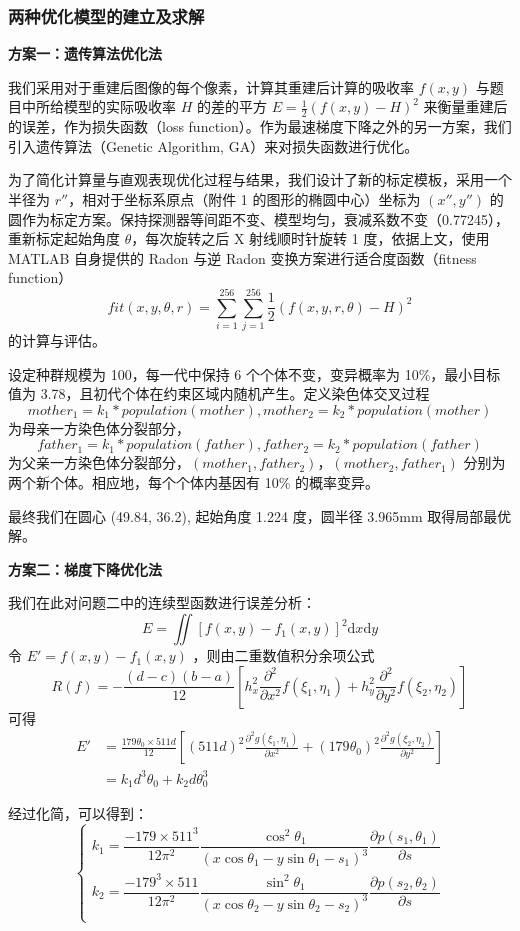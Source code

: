 \documentclass[UTF8]{ctexart}
\begin{document}
\subsubsection{两种优化模型的建立及求解}

\textbf{方案一：遗传算法优化法}

我们采用对于重建后图像的每个像素，计算其重建后计算的吸收率 $f(x, y)$ 与题目中所给模型的实际吸收率 $H$ 的差的平方 $E = \frac{1}{2}(f(x, y) - H)^2$ 来衡量重建后的误差，作为损失函数（loss function）。作为最速梯度下降之外的另一方案，我们引入遗传算法（Genetic Algorithm, GA）来对损失函数进行优化。

为了简化计算量与直观表现优化过程与结果，我们设计了新的标定模板，采用一个半径为 $r''$，相对于坐标系原点（附件 1 的图形的椭圆中心）坐标为 $(x'', y'')$ 的圆作为标定方案。保持探测器等间距不变、模型均匀，衰减系数不变（0.77245），重新标定起始角度 $\theta$，每次旋转之后 X 射线顺时针旋转 1 度，依据上文，使用 MATLAB 自身提供的 Radon 与逆 Radon 变换方案进行适合度函数（fitness function）
$$fit(x, y, \theta, r) = \sum_{i = 1}^{256}\sum_{j = 1}^{256}\frac{1}{2}(f(x, y, r, \theta) - H)^2$$
的计算与评估。

设定种群规模为 100，每一代中保持 6 个个体不变，变异概率为 10\%，最小目标值为 3.78，且初代个体在约束区域内随机产生。定义染色体交叉过程
$$mother_1 = k_1 * population(mother), mother_2 = k_2 * population(mother)$$
为母亲一方染色体分裂部分，
$$father_1 = k_1 * population(father), father_2 = k_2 * population(father)$$
为父亲一方染色体分裂部分，$(mother_1, father_2)$，$(mother_2, father_1)$ 分别为两个新个体。相应地，每个个体内基因有 10\% 的概率变异。

最终我们在圆心 (49.84, 36.2), 起始角度 1.224 度，圆半径 3.965mm 取得局部最优解。

\textbf{方案二：梯度下降优化法}

我们在此对问题二中的连续型函数进行误差分析：
$$ E=\iint [f(x,y)-f_1(x,y)]^2\mathrm{d}x\mathrm{d}y $$
令 $ E'=f(x,y)-f_1(x,y) $ ，则由二重数值积分余项公式 
$$ R(f)=-\frac{(d-c)(b-a)}{12}[h_x^2\frac{\partial^2}{\partial x^2}f(\xi_1,\eta_1)+h_y^2\frac{\partial^2}{\partial y^2}f(\xi_2,\eta_2)] $$
可得
\begin{align*}
E' &= \frac{179\theta_0\times511d}{12}[(511d)^2\frac{\partial^2g(\xi_1,\eta_1)}{\partial x^2}+(179\theta_0)^2\frac{\partial^2g(\xi_2,\eta_2)}{\partial y^2}] \\
   &= k_1d^3\theta_0+k_2d\theta_0^3 
\end{align*}

经过化简，可以得到：
$$
\begin{cases}
  k_1=\dfrac{-179\times511^3}{12\pi^2}\dfrac{\cos^2\theta_1}{(x\cos\theta_1-y\sin\theta_1-s_1)^3}\dfrac{\partial p(s_1,\theta_1)}{\partial s}  \\
  k_2=\dfrac{-179^3\times511}{12\pi^2}\dfrac{\sin^2\theta_1}{(x\cos\theta_2-y\sin\theta_2-s_2)^3}\dfrac{\partial p(s_2,\theta_2)}{\partial s}  \\
\end{cases}
$$
\end{document}
